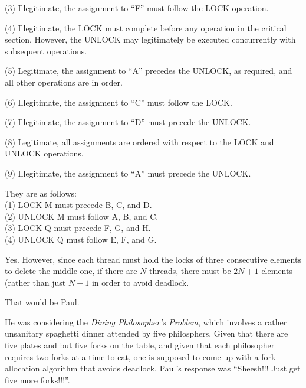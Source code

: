 	(3) Illegitimate, the assignment to ``F'' must follow the LOCK
	operation.

	(4) Illegitimate, the LOCK must complete before any operation in
	the critical section.  However, the UNLOCK may legitimately
	be executed concurrently with subsequent operations.

	(5) Legitimate, the assignment to ``A'' precedes the UNLOCK,
	as required, and all other operations are in order.

	(6) Illegitimate, the assignment to ``C'' must follow the LOCK.

	(7) Illegitimate, the assignment to ``D'' must precede the UNLOCK.

	(8) Legitimate, all assignments are ordered with respect to the
	LOCK and UNLOCK operations.

	(9) Illegitimate, the assignment to ``A'' must precede the UNLOCK.
	


	   They are as follows: \\
	   (1) LOCK M must precede B, C, and D. \\
	   (2) UNLOCK M must follow A, B, and C. \\
	   (3) LOCK Q must precede F, G, and H. \\
	   (4) UNLOCK Q must follow E, F, and G.


	Yes.
	However, since each thread must hold the locks of three
	consecutive elements to delete the middle one, if there
	are $N$ threads, there must be $2N+1$ elements (rather than
	just $N+1$ in order to avoid deadlock.


	That would be Paul.

	He was considering the \emph{Dining Philosopher's Problem}, which
	involves a rather unsanitary spaghetti dinner attended by
	five philosphers.
	Given that there are five plates and but five forks on the table, and
	given that each philosopher requires two forks at a time to eat,
	one is supposed to come up with a fork-allocation algorithm that
	avoids deadlock.
	Paul's response was ``Sheesh!!!  Just get five more forks!!!''.

